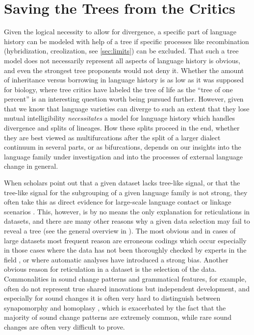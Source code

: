 \documentclass[svgnames,12pt]{scrartcl}
\begin{document}
{{\section{Saving the Trees from the Critics}
Given the logical necessity to allow for divergence, a specific part of language history can be
modeled with help of a tree if specific processes like recombination (hybridization, creolization,
see \ref{sec:limits}) can be excluded. That such a tree model does not necessarily represent all aspects of
language history is obvious, and even the strongest tree proponents would not deny it. Whether the
amount of inheritance versus borrowing in language history is as low as it was supposed for biology,
where tree critics have labeled the tree of life as the ``tree of one percent'' \citep{Dagan2006} is
an interesting question worth being pursued further. However, given that we know that language
varieties can diverge to such an extent that they lose mutual intelligibility \emph{necessitates} a
model for language history which handles divergence and splits of lineages. How these splits proceed
in the end, whether they are best viewed as multifurcations after the split of a larger dialect
continuum in several parts, or as bifurcations, depends on our insights into the language family
under investigation and into the processes of external language change in general.  
 
When scholars point out that a given dataset lacks tree-like signal, or that the tree-like signal
for the subgrouping of a given language family is not strong, they often take this as direct
evidence for large-scale language contact or linkage scenarios \citep{Ross1988}.  This, however, is
by no means the only explanation for reticulations in datasets, and there are many other reasons why
a given data selection may fail to reveal a tree (see the general overview in
\citealt[44-66]{Morrison2011}). The most obvious and in cases of large datasets most frequent reason
are erroneous codings which occur especially in those cases where the data has not been thoroughly
checked by experts in the field \citep{Geisler2010}, or where automatic analyses have introduced a
strong bias. Another obvious reason for reticulation in a dataset is the selection of the data.
Commonalities in sound change patterns and grammatical features, for example, often do not represent
true shared innovations but independent development, and especially for sound changes it is often
very hard to distinguish between synapomorphy and homoplasy \citep[182f]{Chacon2015a}, which is
exacerbated by the fact that the majority of sound change patterns are extremely common, while rare
sound changes are often very difficult to prove. 
 
}}
\end{document}
